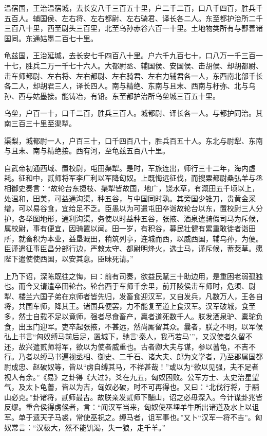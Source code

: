 \documentclass[12pt,UTF8]{ctexbook}
\begin{document}
温宿国，王治温宿城，去长安八千三百五十里，户二千二百，口八千四百，胜兵千五百人。辅国侯、左右将、左右都尉、左右骑君、译长各二人。东至都护治所二千三百八十里，西至尉头三百里，北至乌孙赤谷六百一十里。土地物类所有与鄯善诸国同。东通姑墨二百七十里。



龟兹国，王治延城，去长安七千四百八十里。户六千九百七十，口八万一千三百一十七，胜兵二万一千七十六人。大都尉丞、辅国侯、安国侯、击胡侯、却胡都尉、击车师都尉、左右将、左右都尉、左右骑君、左右力辅君各一人，东西南北部千长各二人，却胡君三人，译长四人。南与精绝、东南与且末、西南与杅弥、北与乌孙、西与姑墨接。能铸冶，有铅。东至都护治所乌垒城三百五十里。



乌垒，户百一十，口千二百，胜兵三百人。城都尉、译长各一人。与都护同治。其南三百三十里至渠犁。



渠梨，城都尉一人，户百三十，口千四百八十，胜兵百五十人。东北与尉犁、东南与且末、南与精绝接。西有河，至龟兹五百八十里。



自武帝初通西域、置校尉，屯田渠犁。是时，军旅连出，师行三十二年，海内虚耗。征和中，贰师将军李广利以军降匈奴。上既悔远征伐，而搜粟都尉桑弘羊与丞相御史奏言：“故轮台东捷枝、渠犁皆故国，地广，饶水草，有溉田五千顷以上，处温和，田美，可益通沟渠，种五谷，与中国同时孰。其旁国少锥刀，贵黄金采缯，可以易谷食，宜给足不乏。臣愚以为可遣屯田卒诣故轮台以东，置校尉三人分护，各举图地形，通利沟渠，务使以时益种五谷，张掖、酒泉遣骑假司马为斥候，属校尉，事有便宜，因骑置以闻。田一岁，有积谷，募民壮健有累重敢徙者诣田所，就畜积为本业，益垦溉田，稍筑列亭，连城而西，以威西国，辅乌孙，为便。臣谨遣征事臣昌分部行边，严敕太守、都尉明烽火，选士马，谨斥候，蓄茭草。愿陛下遣使使西国，以安其意。臣昧死请。”



上乃下诏，深陈既往之悔，曰：前有司奏，欲益民赋三十助边用，是重困老弱孤独也。而今又请遣卒田轮台。轮台西于车师千余里，前开陵侯击车师时，危须、尉犁、楼兰六国子弟在京师者皆先归，发畜食迎汉军，又自发兵，凡数万人，王各自将，共围车师，降其王。诸国兵便罢，力不能复至道上食汉军。汉军破城，食至多，然士自载不足以竟师，强者尽食畜产，羸者道死数千人。朕发酒泉驴、橐驼负食，出玉门迎军。吏卒起张掖，不甚远，然尚厮留其众。曩者，朕之不明，以军候弘上书言“匈奴缚马前后足，置城下，驰言‘秦人，我丐若马’”，又汉使者久留不还，故兴遣贰师将军，欲以为使者威重也。古者卿大夫与谋，参以蓍龟，不吉不行。乃者以缚马书遍视丞相、御史、二千石、诸大夫、郎为文学者，乃至郡属国都尉成忠、赵破奴等，皆以“虏自缚其马，不祥甚哉！”或以为“欲以见强，夫不足者视人有余。”《易》之卦得《大过》，爻在九五，匈奴困败。公军方士、太史治星望气，及太卜龟蓍，皆以为吉，匈奴必破，时不可再得也。又曰：“北伐行将，于鬴山必克。”卦诸将，贰师最吉。故朕亲发贰师下鬴山，诏之必毋深入。今计谋卦兆皆反缪。重合侯得虏候者，言：“闻汉军当来，匈奴使巫埋羊牛所出诸道及水上以诅军。单于遗天子马裘，常使巫祝之。缚马者，诅军事也。”又卜“汉军一将不吉”。匈奴常言：“汉极大，然不能饥渴，失一狼，走千羊。”
\end{document}
